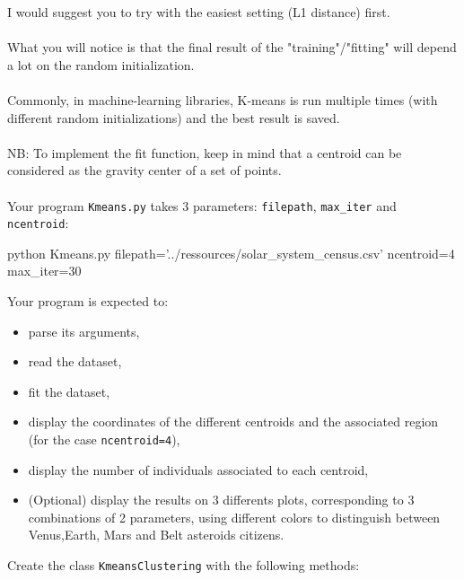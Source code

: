 I would suggest you to try with the easiest setting (L1 distance) first.\\
\\
What you will notice is that the final result of the "training"/"fitting" will depend a lot on the random initialization.\\
\\
Commonly, in machine-learning libraries, K-means is run multiple times (with different random initializations) and the best result is saved.\\  
\\
NB: To implement the fit function, keep in mind that a centroid can be considered as the gravity center of a set of points.\\
\\
Your program \texttt{Kmeans.py} takes 3 parameters: \texttt{filepath}, \texttt{max\_iter} and \texttt{ncentroid}:

\begin{42console}
  python Kmeans.py filepath='../ressources/solar_system_census.csv' ncentroid=4 max_iter=30
\end{42console}

Your program is expected to:
\begin{itemize}
  \item parse its arguments,
  \item read the dataset,
  \item fit the dataset,
  \item display the coordinates of the different centroids and the associated region (for the case \texttt{ncentroid=4}),
  \item display the number of individuals associated to each centroid,
  \item (Optional) display the results  on 3 differents plots, corresponding to 3 combinations of 2 parameters, using different colors to distinguish between Venus,Earth, Mars and Belt asteroids citizens.
\end{itemize}

Create the class \texttt{KmeansClustering} with the following methods:  

